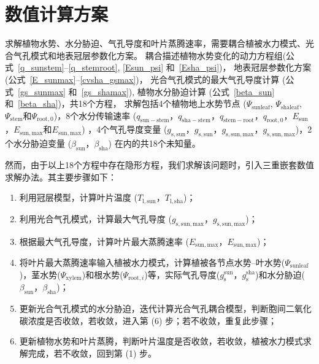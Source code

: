 \section{数值计算方案}\label{数值计算方案}
求解植物水势、水分胁迫、气孔导度和叶片蒸腾速率，需要耦合植被水力模式、光合气孔模式和地表冠层参数化方案。
耦合描述植物水势变化的动力方程组(公式~\eqref{q_sunstem}--\eqref{q_stemroot}, \eqref{Esun_psi} 和~\eqref{Esha_psi})，
地表冠层参数化方案 (公式~\eqref{E_sunmax}--\eqref{cvsha_gsmax})，
光合气孔模式的最大气孔导度计算 (公式~\eqref{gs_sunmax} 和~\eqref{gs_shamax}), 植物水分胁迫计算 (公式~\eqref{beta_sun} 和~\eqref{beta_sha})，共18个方程，
求解包括4个植物地上水势节点 ($\Psi_{\mathrm{sunleaf}}$, $\Psi_{\mathrm{shaleaf}}$, $\Psi_{\mathrm{stem}}$和$\Psi_{\mathrm{root,0}}$)，8个水分传输速率 
($q_{\mathrm{sun-stem}}$，$q_{\mathrm{sha-stem}}$，$q_{\mathrm{stem-root}}$，$q_{\mathrm{root,0}}$，$E_{\mathrm{sun}}$，$E_{\mathrm{sun,max}}$和$E_{\mathrm{sun,max}}$) ，4个气孔导度变量
($g_{\mathrm{s,sun}}$，$g_{\mathrm{s,sun}}$，$g_{\mathrm{s,sun,max}}$，$g_{\mathrm{s,sun,max}}$)，2个水分胁迫变量 ($\beta_{\mathrm{sun}}$，$\beta_{\mathrm{sha}}$) 在内的共18个未知量。

然而，由于以上18个方程中存在隐形方程，我们求解该问题时，引入三重嵌套数值求解办法。其主要步骤如下：
\begin{enumerate}
  \item 利用冠层模型，计算叶片温度 ($T_{\mathrm{l,sun}}$，$T_{\mathrm{l,sha}}$)；
  \item 利用光合气孔模式，计算最大气孔导度 ($g_{\mathrm{s,sun,max}}$，$g_{\mathrm{s,sun,max}}$)；
  \item 根据最大气孔导度，计算叶片最大蒸腾速率 ($E_{\mathrm{sun,max}}$，$E_{\mathrm{sun,max}}$)；
  \item 将叶片最大蒸腾速率输入植被水力模式，计算植被各节点水势--叶水势($\Psi_{\mathrm{sunleaf}}$)，茎水势($\Psi_{\mathrm{xylem}}$)和根水势($\Psi_{\mathrm{root},i}$)等，实际气孔导度($g_{\mathrm{s}}^{\mathrm {sun}}$，$g_{\mathrm{s}}^{\mathrm {sha}}$)和水分胁迫($\beta_{\mathrm{sun}}$，$\beta_{\mathrm{sha}}$)；
  \item 更新光合气孔模式的水分胁迫，迭代计算光合气孔耦合模型，判断胞间二氧化碳浓度是否收敛，若收敛，进入第 (6) 步；若不收敛，重复此步骤；
  \item 更新植物水势和叶片蒸腾，判断叶片温度是否收敛，若收敛，植被水力模式求解完成，若不收敛，回到第 (1) 步。
\end{enumerate}
